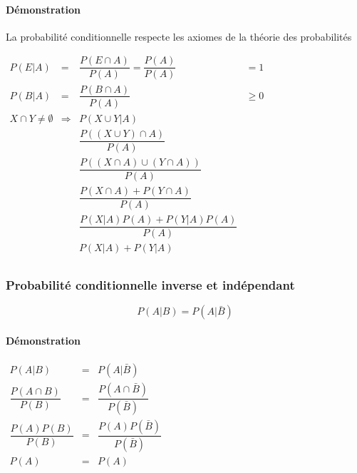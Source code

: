 \paragraph{Démonstration}
La probabilité conditionnelle respecte les axiomes de la théorie des probabilités
\begin{center}
	$\begin{array}{LCCL}
		P(E|A) &=& \dfrac{P(E\cap A)}{P(A)} = \dfrac{P(A)}{P(A)}&=1\\
		P(B|A) &=& \dfrac{P(B\cap A)}{P(A)}&\geq0\\
		X\cap Y\neq\emptyset &\Rightarrow& P(X\cup Y |A)\\
		&&\dfrac{P((X\cup Y)\cap A)}{P(A)}\\
		&&\dfrac{P((X\cap A)\cup (Y\cap A))}{P(A)}\\
		&&\dfrac{P(X\cap A) + P(Y\cap A)}{P(A)}\\
		&&\dfrac{P(X|A)P(A) + P(Y|A)P(A)}{P(A)}\\
		&&P(X|A) + P(Y|A)\\
	\end{array}$
\end{center}






\subsubsection{Probabilité conditionnelle inverse et indépendant}
$$P(A|B) = P(A|\bar{B})$$
\paragraph{Démonstration}
\begin{center}
	$\begin{array}{CCC}
		P(A|B)                   &=& P(A|\bar{B})\\
		\dfrac{P(A\cap B)}{P(B)} &=& \dfrac{P(A\cap\bar{B})}{P(\bar{B})}\\
		\dfrac{P(A) P(B)}{P(B)}  &=& \dfrac{P(A)P(\bar{B})}{P(\bar{B})}\\
		P(A)                     &=& P(A)\\
	\end{array}$
\end{center}








